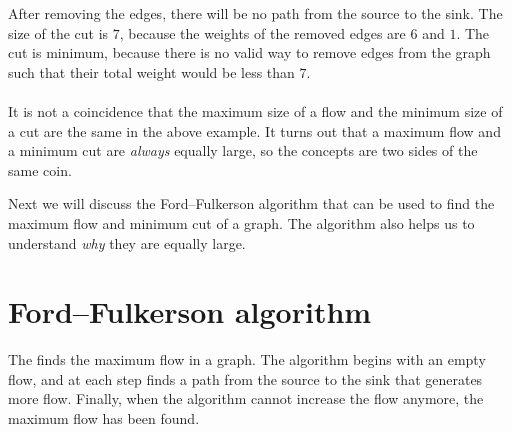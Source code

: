 \begin{center}
\end{center}

After removing the edges,
there will be no path from the source to the sink.
The size of the cut is $7$,
because the weights of the removed edges
are $6$ and $1$.
The cut is minimum, because there is no valid
way to remove edges from the graph such that
their total weight would be less than $7$.
\\\\
It is not a coincidence that
the maximum size of a flow
and the minimum size of a cut
are the same in the above example.
It turns out that a maximum flow
and a minimum cut are
\emph{always} equally large,
so the concepts are two sides of the same coin.

Next we will discuss the Ford–Fulkerson
algorithm that can be used to find
the maximum flow and minimum cut of a graph.
The algorithm also helps us to understand
\emph{why} they are equally large.

\section{Ford–Fulkerson algorithm}


The  \cite{for56} finds
the maximum flow in a graph.
The algorithm begins with an empty flow,
and at each step finds a path from the source
to the sink that generates more flow.
Finally, when the algorithm cannot increase the flow
anymore, the maximum flow has been found.

